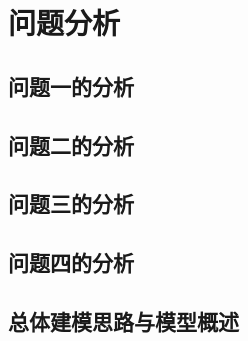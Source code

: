 \section{问题分析}

\subsection{问题一的分析}

\subsection{问题二的分析}

\subsection{问题三的分析}

\subsection{问题四的分析}


\subsection{总体建模思路与模型概述}
